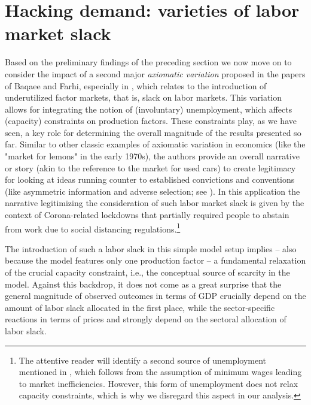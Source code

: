 
\section{Hacking demand: varieties of labor market slack} \label{sec:labor}

Based on the preliminary findings of the preceding section we now move on to consider the impact of a second major \textit{axiomatic variation} \citep{Kapeller.2013} proposed in the papers of Baqaee and Farhi, especially in \citet{Baqaee.2021,BF2022}, which relates to the introduction of underutilized factor markets, that is, slack on labor markets. This variation allows for integrating the notion of (involuntary) unemployment, which affects (capacity) constraints on production factors. These constraints play, as we have seen, a key role for determining the overall magnitude of the results presented so far. Similar to other classic examples of axiomatic variation in economics (like the "market for lemons" in the early 1970s), the authors provide an overall narrative or story (akin to the reference to the market for used cars) to create legitimacy for looking at ideas running counter to established convictions and conventions (like asymmetric information and adverse selection; see \cite{Akerlof.1970}). In this application the narrative legitimizing the consideration of such labor market slack is given by the context of Corona-related lockdowns that partially required people to abstain from work due to social distancing regulations.\footnote{The attentive reader will identify a second source of unemployment mentioned in \citet{BF2022}, which follows from the assumption of minimum wages leading to market inefficiencies. However, this form of unemployment does not relax capacity constraints, which is why we disregard this aspect in our analysis.}

The introduction of such a labor slack in this simple model setup implies -- also because the model features only one production factor -- a fundamental relaxation of the crucial capacity constraint, i.e., the conceptual source of scarcity in the model. Against this backdrop, it does not come as a great surprise that the general magnitude of observed outcomes in terms of GDP crucially depend on the amount of labor slack allocated in the first place, while the sector-specific reactions in terms of prices and strongly depend on the sectoral allocation of labor slack. 

